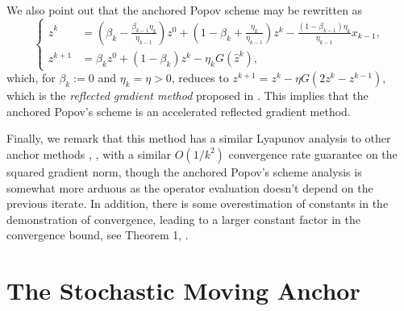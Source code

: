 \documentclass[11pt,reqno,oneside]{amsart}
\theoremstyle{definition}
\numberwithin{equation}{section}
\begin{document}
We also point out that the anchored Popov scheme may be rewritten as 
\[
\begin{cases}
    \hat{z}^{k} &= (\beta_{k} - \frac{\beta_{k-1}\eta_{k}}{\eta_{k-1}})z^{0} + (1 - \beta_{k} + \frac{\eta_{k}}{\eta_{k-1}})z^{k} - \frac{(1 - \beta_{k-1})\eta_{k}}{\eta_{k-1}}x_{k-1}, \\
    z^{k+1} &= \beta_{k}z^{0} + (1 - \beta_{k})z^{k} - \eta_{k}G(\hat{z}^{k}),
\end{cases}
\]
which, for $\beta_{k} := 0$ and $\eta_{k} = \eta > 0$, reduces to $z^{k+1} = z^{k} - \eta G(2z^{k} - z^{k-1}),$ which is the \textit{reflected gradient method} proposed in \cite{Malitsky_2015}. This implies that the anchored Popov's scheme is an accelerated reflected gradient method.

Finally, we remark that this method has a similar Lyapunov analysis to other anchor methods \cite{yoon_ryu}, \cite{lee2021fast}, \cite{alcala2023moving} with a similar $O(1/k^{2})$ convergence rate guarantee on the squared gradient norm, though the anchored Popov's scheme analysis is somewhat more arduous as the operator evaluation doesn't depend on the previous iterate. In addition, there is some overestimation of constants in the demonstration of convergence, leading to a larger constant factor in the convergence bound, see Theorem 1, \cite{tran2021halpern}.

\section{The Stochastic Moving Anchor}

\end{document}
